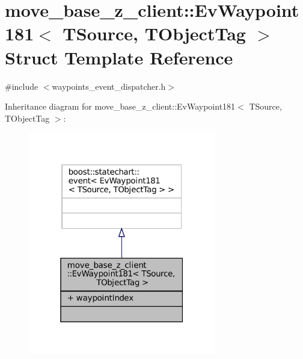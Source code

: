 \hypertarget{structmove__base__z__client_1_1EvWaypoint181}{}\section{move\+\_\+base\+\_\+z\+\_\+client\+:\+:Ev\+Waypoint181$<$ T\+Source, T\+Object\+Tag $>$ Struct Template Reference}
\label{structmove__base__z__client_1_1EvWaypoint181}


{\ttfamily \#include $<$waypoints\+\_\+event\+\_\+dispatcher.\+h$>$}



Inheritance diagram for move\+\_\+base\+\_\+z\+\_\+client\+:\+:Ev\+Waypoint181$<$ T\+Source, T\+Object\+Tag $>$\+:
\nopagebreak
\begin{figure}[H]
\begin{center}
\leavevmode
\includegraphics[width=232pt]{structmove__base__z__client_1_1EvWaypoint181__inherit__graph}
\end{center}
\end{figure}


